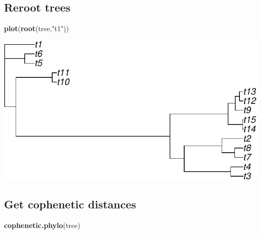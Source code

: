 \documentclass[
]{book}
\newenvironment{Shaded}{\begin{snugshade}}{\end{snugshade}}
\newcommand{\FunctionTok}[1]{\textcolor[rgb]{0.13,0.29,0.53}{\textbf{#1}}}
\newcommand{\NormalTok}[1]{#1}
\newcommand{\StringTok}[1]{\textcolor[rgb]{0.31,0.60,0.02}{#1}}
\begin{document}
\subsection{Reroot trees}\label{reroot-trees}

\begin{Shaded}
\begin{Highlighting}[]
\FunctionTok{plot}\NormalTok{(}\FunctionTok{root}\NormalTok{(tree,}\StringTok{"t1"}\NormalTok{))}
\end{Highlighting}
\end{Shaded}

\includegraphics{pcm-workshop_files/figure-latex/Reroot trees-1.pdf}

\subsection{Get cophenetic distances}\label{get-cophenetic-distances}

\begin{Shaded}
\begin{Highlighting}[]
\FunctionTok{cophenetic.phylo}\NormalTok{(tree)}
\end{Highlighting}
\end{Shaded}
\end{document}
